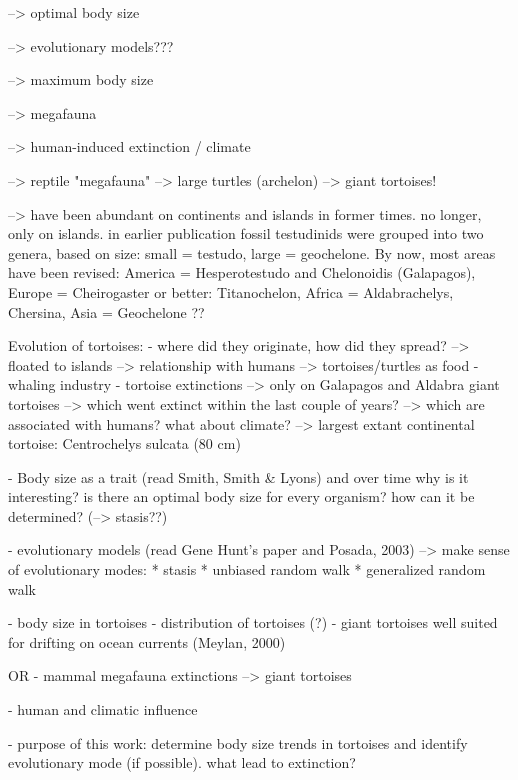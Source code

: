\vspace{3 cm}


--> optimal body size

--> evolutionary models???

--> maximum body size 

--> megafauna 

--> human-induced extinction / climate

--> reptile "megafauna" --> large turtles (archelon) --> giant tortoises!

--> have been abundant on continents and islands in former times. no longer, only on islands.
in earlier publication fossil testudinids were grouped into two genera, based on size: small = testudo, large = geochelone. 
By now, most areas have been revised: America = Hesperotestudo and Chelonoidis (Galapagos), Europe = Cheirogaster or better: Titanochelon, Africa = Aldabrachelys, Chersina, Asia = Geochelone ??

Evolution of tortoises:
- where did they originate, how did they spread?
--> floated to islands
--> relationship with humans --> tortoises/turtles as food - whaling industry
- tortoise extinctions --> only on Galapagos and Aldabra giant tortoises --> which went extinct within the last couple of years? --> which are associated with humans?
what about climate?
--> largest extant continental tortoise: Centrochelys sulcata (80 cm)






- Body size as a trait (read Smith, Smith \& Lyons) and over time
why is it interesting?
is there an optimal body size for every organism? how can it be determined? (--> stasis??)

- evolutionary models (read Gene Hunt's paper and Posada, 2003)
-->  make sense of evolutionary modes:
* stasis
* unbiased random walk
* generalized random walk


- body size in tortoises %
- distribution of tortoises (?)
- giant tortoises well suited for drifting on ocean currents (Meylan, 2000)

OR
- mammal megafauna extinctions --> giant tortoises

- human and climatic influence

- purpose of this work: determine body size trends in tortoises and identify evolutionary mode (if possible). what lead to extinction?




